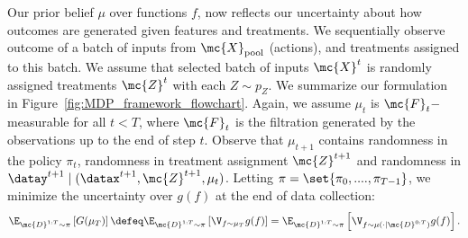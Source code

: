  Our prior belief  $\mu$ over functions $f$, now 
 reflects our uncertainty about how
outcomes are generated given features and treatments. 
  We sequentially observe outcome of a batch of inputs from $\mc{X}_{\rm pool}$ (actions), and treatments assigned to this batch. We assume that selected batch of inputs $\mc{X}^t$ is randomly assigned treatments $\mc{Z}^t$ with each $Z\sim p_Z$. We summarize our formulation in Figure~\ref{fig:MDP_framework_flowchart}.
Again, we assume $\mu_t$ is $\mc{F}_t-$measurable for all $t < T$, where $\mc{F}_t$ is the filtration generated by the observations up to the end of step $t$.
 Observe that $\mu_{t+1}$ contains randomness in the policy $\pi_t$, randomness in treatment assignment $\mc{Z}^{t+1}$ and randomness in $\datay^{t+1} \mid (\datax^{t+1}, \mc{Z}^{t+1},\mu_t)$. Letting $\pi = \set{\pi_0,....,\pi_{T-1}}$,  we minimize the uncertainty over $g(f)$
 at the end of data collection:
\begin{align}
\E_{\mc{D}^{1:T} \sim \pi} \left[G(\mu_{T}) \right] \defeq
\E_{\mc{D}^{1:T} \sim \pi} \left[ \V_{f \sim \mu_{T}}  g(f)  \right]
= \E_{\mc{D}^{1:T} \sim \pi} \left[ \V_{f \sim \mu(\cdot \mid \mc{D}^{0:T})}  g(f)  \right].
\label{eqn:general-ate-obj}
\end{align}  


 

